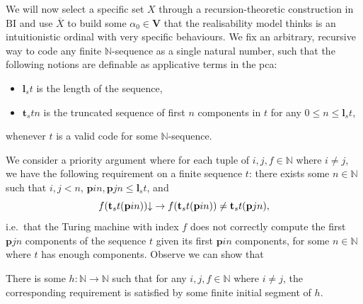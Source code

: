 \documentclass[preprint]{elsarticle}
\theoremstyle{plain}
\begin{document}
We will now select a specific set $X$ through a recursion-theoretic construction in $\mathrm{BI}$ and use $\overline{X}$ to build some $\alpha_0 \in \mathbf{V}$ that the realisability model thinks is an intuitionistic ordinal with very specific behaviours. We fix an arbitrary, recursive way to code any finite $\mathbb{N}$-sequence as a single natural number, such that the following notions are definable as applicative terms in the pca:
\begin{itemize}
  \item $\mathbf{l}_s t$ is the length of the sequence,
  \item $\mathbf{t}_s tn$ is the truncated sequence of first $n$ components in $t$ for any $0 \leq n \leq \mathbf{l}_s t$,
\end{itemize}
whenever $t$ is a valid code for some $\mathbb{N}$-sequence.

We consider a priority argument where for each tuple of $i, j, f \in \mathbb{N}$ where $i \neq j$, we have the following requirement on a finite sequence $t$: there exists some $n \in \mathbb{N}$ such that $i, j < n$, $\mathbf{p}in, \mathbf{p}jn \leq \mathbf{l}_s t$, and
\[f\mleft(\mathbf{t}_s t \mleft(\mathbf{p}in\mright)\mright) {\downarrow} \rightarrow f\mleft(\mathbf{t}_s t \mleft(\mathbf{p}in\mright)\mright) \neq \mathbf{t}_s t \mleft(\mathbf{p}jn\mright),\]
i.e.\ that the Turing machine with index $f$ does not correctly compute the first $\mathbf{p}jn$ components of the sequence $t$ given its first $\mathbf{p}in$ components, for some $n \in \mathbb{N}$ where $t$ has enough components. Observe we can show that

\begin{proposition}
  \label{prop:non-comp-path}
  There is some $h : \mathbb{N} \rightarrow \mathbb{N}$ such that for any $i, j, f \in \mathbb{N}$ where $i \neq j$, the corresponding requirement is satisfied by some finite initial segment of $h$.
\end{proposition}
\end{document}
